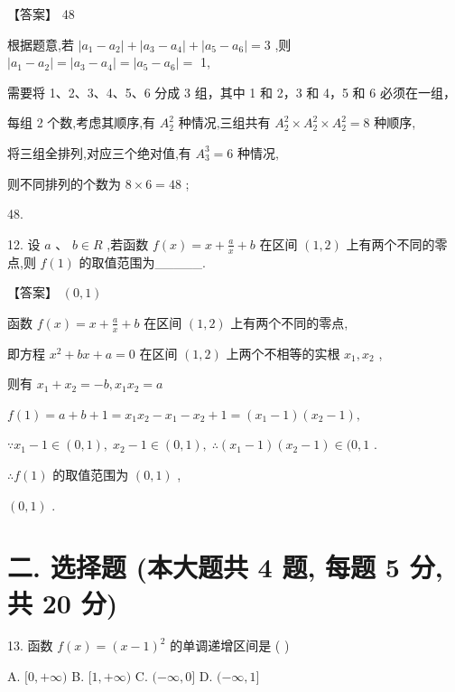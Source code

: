 \documentclass[10pt]{article}
\begin{document}
【答案】 48

根据题意,若 \(\left| {{a}_{1} - {a}_{2}}\right|  + \left| {{a}_{3} - {a}_{4}}\right|  + \left| {{a}_{5} - {a}_{6}}\right|  = 3\) ,则 \(\left| {{a}_{1} - {a}_{2}}\right|  = \left| {{a}_{3} - {a}_{4}}\right|  = \left| {{a}_{5} - {a}_{6}}\right|  =\) 1,

需要将 1、2、3、4、5、6 分成 3 组，其中 1 和 2，3 和 4，5 和 6 必须在一组，

每组 2 个数,考虑其顺序,有 \({A}_{2}^{2}\) 种情况,三组共有 \({A}_{2}^{2} \times  {A}_{2}^{2} \times  {A}_{2}^{2} = 8\) 种顺序,

将三组全排列,对应三个绝对值,有 \({A}_{3}^{3} = 6\) 种情况,

则不同排列的个数为 \(8 \times  6 = {48}\) ;

48.

12. 设 \(a\text{ 、 }b \in  R\) ,若函数 \(f\left( x\right)  = x + \frac{a}{x} + b\) 在区间 \(\left( {1,2}\right)\) 上有两个不同的零点,则 \(f\left( 1\right)\) 的取值范围为\_\_\_\_\_.

【答案】 \(\left( {0,1}\right)\)

函数 \(f\left( x\right)  = x + \frac{a}{x} + b\) 在区间 \(\left( {1,2}\right)\) 上有两个不同的零点,

即方程 \({x}^{2} + {bx} + a = 0\) 在区间 \(\left( {1,2}\right)\) 上两个不相等的实根 \({x}_{1},{x}_{2}\) ,

则有 \({x}_{1} + {x}_{2} =  - b,{x}_{1}{x}_{2} = a\)

\(f\left( 1\right)  = a + b + 1 = {x}_{1}{x}_{2} - {x}_{1} - {x}_{2} + 1 = \left( {{x}_{1} - 1}\right) \left( {{x}_{2} - 1}\right) ,\)

\(\because {x}_{1} - 1 \in  \left( {0,1}\right) ,\;{x}_{2} - 1 \in  \left( {0,1}\right) ,\;\therefore \left( {{x}_{1} - 1}\right) \left( {{x}_{2} - 1}\right)  \in  (0,1\) .

\(\therefore f\left( 1\right)\) 的取值范围为 \(\left( {0,1}\right)\) ,

\(\left( {0,1}\right)\) .

\section*{二. 选择题 (本大题共 4 题, 每题 5 分, 共 20 分)}

13. 函数 \(f\left( x\right)  = {\left( x - 1\right) }^{2}\) 的单调递增区间是 ( )

A. \(\lbrack 0, + \infty )\) B. \(\lbrack 1, + \infty )\) C. \(( - \infty ,0\rbrack\) D. \(( - \infty ,1\rbrack\)
\end{document}
